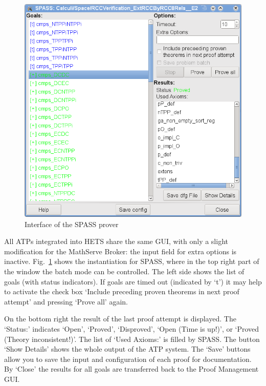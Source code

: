 \documentclass{article}
\newcommand{\normalTEXTSC}[2]{{#1\scriptsize#2}}
\newcommand     {\Hets}{\normalTEXTSC{H}{ETS}\xspace}
\newcommand     {\SPASS}{\normalTEXTSC{S}{PASS}\xspace}
\begin{document}
\begin{figure}
\centering
\includegraphics[width=\textwidth]{spassGUI1}
\caption{Interface of the \SPASS prover\label{fig:SPASS_GUI}}
\end{figure}

All ATPs integrated into \Hets share the same GUI, with only a slight
modification for the MathServe Broker: the input field for extra options is
inactive. Fig.~\ref{fig:SPASS_GUI} shows the instantiation for \SPASS, where
in the top right part of the window the batch mode can be controlled.  The
left side shows the list of goals (with status indicators).  If goals are
timed out (indicated by `t') it may help to activate the check box `Include
preceding proven theorems in next proof attempt' and pressing `Prove all'
again.

On the bottom right the result of the last proof
attempt is displayed.  The `Status:' indicates `Open', `Proved', `Disproved',
`Open (Time is up!)', or `Proved (Theory inconsistent!)'. The list of `Used
Axioms:' is filled by \SPASS. The button `Show Details' shows the whole output
of the ATP system. The `Save' buttons allow you to save the input and
configuration of each proof for documentation. By `Close' the results for all
goals are transferred back to the Proof Management GUI.
\end{document}

